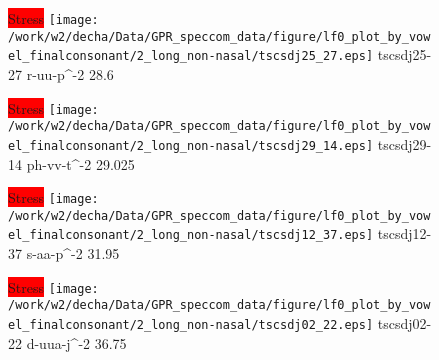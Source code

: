 \documentclass{article}
\begin{document}
\begin{figure}[t]
\begin{minipage}[b]{.24\textwidth}
\colorbox{red}{Stress}
\centering
\texttt{[image: /work/w2/decha/Data/GPR\_speccom\_data/figure/lf0\_plot\_by\_vowel\_finalconsonant/2\_long\_non-nasal/tscsdj25\_27.eps]}
tscsdj25-27 r-uu-p\textasciicircum-2 28.6
\end{minipage}
\begin{minipage}[b]{.24\textwidth}
\colorbox{red}{Stress}
\centering
\texttt{[image: /work/w2/decha/Data/GPR\_speccom\_data/figure/lf0\_plot\_by\_vowel\_finalconsonant/2\_long\_non-nasal/tscsdj29\_14.eps]}
tscsdj29-14 ph-vv-t\textasciicircum-2 29.025
\end{minipage}
\begin{minipage}[b]{.24\textwidth}
\colorbox{red}{Stress}
\centering
\texttt{[image: /work/w2/decha/Data/GPR\_speccom\_data/figure/lf0\_plot\_by\_vowel\_finalconsonant/2\_long\_non-nasal/tscsdj12\_37.eps]}
tscsdj12-37 s-aa-p\textasciicircum-2 31.95
\end{minipage}
\begin{minipage}[b]{.24\textwidth}
\colorbox{red}{Stress}
\centering
\texttt{[image: /work/w2/decha/Data/GPR\_speccom\_data/figure/lf0\_plot\_by\_vowel\_finalconsonant/2\_long\_non-nasal/tscsdj02\_22.eps]}
tscsdj02-22 d-uua-j\textasciicircum-2 36.75
\end{minipage}
\end{figure}
\end{document}
